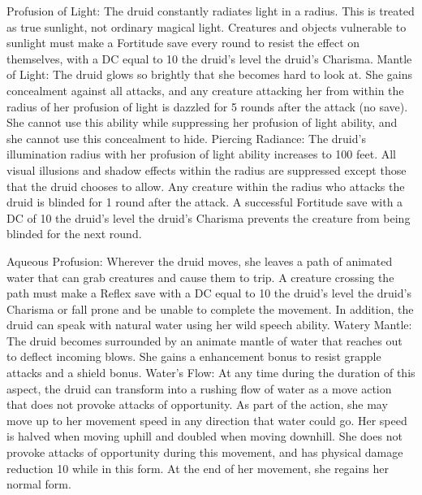 \begin{greaterwildaspect}
\wilditem Profusion of Light: The druid constantly radiates light in a \arealarge radius. This is treated as true sunlight, not ordinary magical light. Creatures and objects vulnerable to sunlight must make a Fortitude save every round to resist the effect on themselves, with a DC equal to 10 \add the druid's level \add the druid's Charisma.
\wilditem Mantle of Light: The druid glows so brightly that she becomes hard to look at. She gains concealment against all attacks, and any creature attacking her from within the radius of her profusion of light is dazzled for 5 rounds after the attack (no save). She cannot use this ability while suppressing her profusion of light ability, and she cannot use this concealment to hide.
\wilditemplus Piercing Radiance: The druid's illumination radius with her profusion of light ability increases to 100 feet. All visual illusions and shadow effects within the radius are suppressed except those that the druid chooses to allow. Any creature within the radius who attacks the druid is blinded for 1 round after the attack. A successful Fortitude save with a DC of 10 \add the druid's level \add the druid's Charisma prevents the creature from being blinded for the next round.
\end{greaterwildaspect}

\begin{greaterwildaspect}
\wilditem Aqueous Profusion: Wherever the druid moves, she leaves a path of animated water that can grab creatures and cause them to trip. A creature crossing the path must make a Reflex save with a DC equal to 10 \add the druid's level \add the druid's Charisma or fall prone and be unable to complete the movement. In addition, the druid can speak with natural water using her wild speech ability.
\wilditem Watery Mantle: The druid becomes surrounded by an animate mantle of water that reaches out to deflect incoming blows. She gains a  enhancement bonus to resist grapple attacks and a  shield bonus.
\wilditemplus Water's Flow: At any time during the duration of this aspect, the druid can transform into a rushing flow of water as a move action that does not provoke attacks of opportunity. As part of the action, she may move up to her movement speed in any direction that water could go. Her speed is halved when moving uphill and doubled when moving downhill. She does not provoke attacks of opportunity during this movement, and has physical damage reduction 10 while in this form. At the end of her movement, she regains her normal form.
\end{greaterwildaspect}

